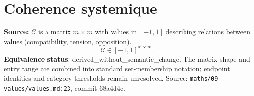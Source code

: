 \section*{Coherence systemique}
\textbf{Source:} $\mathcal{C}$ is a matrix $m\times m$ with values in $[-1,1]$ describing relations between values (compatibility, tension, opposition).
\[
\mathcal{C}\in[-1,1]^{m\times m}.
\]
\textbf{Equivalence status:} derived\_without\_semantic\_change. The matrix shape and entry range are combined into standard set-membership notation; endpoint identities and category thresholds remain unresolved. Source: \texttt{maths/09-values/values.md:23}, commit 68a4d4c.
